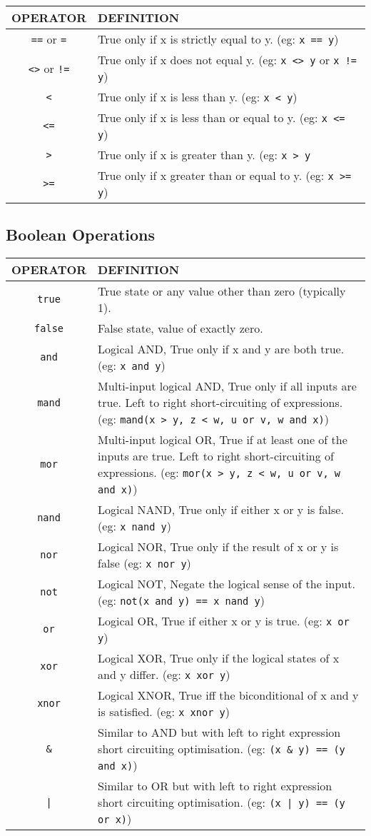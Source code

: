 \begin{tabular}{|c|p{}|}
\hline
OPERATOR & DEFINITION\\
\hline
\verb'==' or \verb'=' & True only if x is strictly equal to y. (eg: \verb'x == y')\\
\verb'<>' or \verb'!='& True only if x does not equal y. (eg: \verb'x <> y' or \verb'x != y')\\
\verb'<'& True only if x is less than y. (eg: \verb'x < y')\\
\verb'<='& True only if x is less than or equal to y. (eg: \verb'x <= y')\\
\verb'>'& True only if x is greater than y. (eg: \verb'x > y'\\
\verb'>='& True only if x greater than or equal to y. (eg: \verb'x >= y')\\
\hline
\end{tabular}

\subsection{Boolean Operations}

\begin{tabular}{|c|p{}|}
\hline
OPERATOR& DEFINITION\\
\hline
\verb'true'& True state or any value other than zero (typically 1).\\
\verb'false'& False state, value of exactly zero.\\
\verb'and'& Logical AND, True only if x and y are both true. (eg: \verb'x and y')\\
\verb'mand'& Multi-input logical AND, True only if all inputs are true. Left to right short-circuiting of expressions. (eg: \verb'mand(x > y, z < w, u or v, w and x)')\\
\verb'mor'& Multi-input logical OR, True if at least one of the inputs
are true. Left to right short-circuiting of expressions.  (eg:
\verb'mor(x > y, z < w, u or v, w and x)')\\
\verb'nand'& Logical NAND, True only if either x or y is false. (eg: \verb'x nand y')\\
\verb'nor'& Logical NOR, True only if the result of x or y is false (eg: \verb'x nor y')\\
\verb'not'& Logical NOT, Negate the logical sense of the input. (eg: \verb'not(x and y) == x nand y')\\
\verb'or'& Logical OR, True if either x or y is true. (eg: \verb'x or y') \\
\verb'xor'& Logical XOR, True only if the logical states of x and y differ.  (eg: \verb'x xor y')\\
\verb'xnor'& Logical XNOR, True iff the biconditional of x and y is
satisfied.  (eg: \verb'x xnor y')\\
\verb'&'& Similar to AND but with left to right expression short circuiting optimisation.  (eg: \verb'(x & y) == (y and x)')\\
\verb'|'& Similar to OR but with left to right expression short
circuiting optimisation.  (eg: \verb'(x | y) == (y or x)')\\
\hline
\end{tabular}

